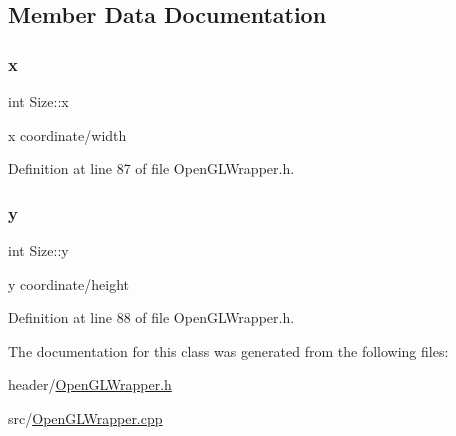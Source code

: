 \subsection{Member Data Documentation}
\mbox{\label{classSize_ab08283a0a20dc6c8659a10896bf1ad1f}} 
\subsubsection{\texorpdfstring{x}{x}}
{\footnotesize\ttfamily int Size\+::x\hspace{0.3cm}{\ttfamily [private]}}

x coordinate/width 

Definition at line 87 of file Open\+G\+L\+Wrapper.\+h.

\mbox{\label{classSize_aaee100979a10f98dacb8fa81c8bcc030}} 
\subsubsection{\texorpdfstring{y}{y}}
{\footnotesize\ttfamily int Size\+::y\hspace{0.3cm}{\ttfamily [private]}}

y coordinate/height 

Definition at line 88 of file Open\+G\+L\+Wrapper.\+h.



The documentation for this class was generated from the following files\+:\begin{DoxyCompactItemize}
\item 
header/\mbox{\hyperlink{OpenGLWrapper_8h}{Open\+G\+L\+Wrapper.\+h}}\item 
src/\mbox{\hyperlink{OpenGLWrapper_8cpp}{Open\+G\+L\+Wrapper.\+cpp}}\end{DoxyCompactItemize}
